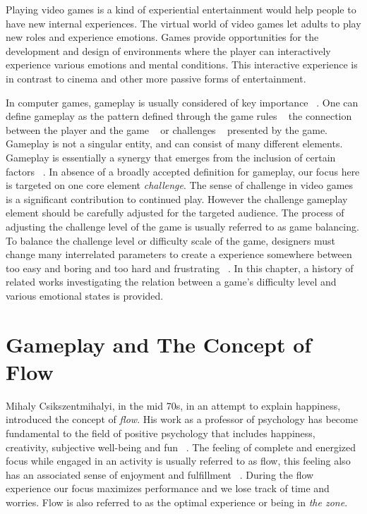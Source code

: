 
Playing video games is a kind of experiential entertainment would help people to have new internal experiences. The virtual world of video games let adults to play new roles and experience emotions. Games provide opportunities for the development and design of environments where the player can interactively experience various emotions and mental conditions. This interactive experience is in contrast to cinema and other more passive forms of entertainment.

In computer games, gameplay is usually considered of key importance ~\cite{rollings2006fundamentals, malone1982makes}. One can define gameplay as the pattern defined through the game rules ~\cite{salen2004rules, pajares2008understanding} the connection between the player and the game ~\cite{laramee2002game} or challenges ~\cite{rollings2003andrew} presented by the game. Gameplay is not a singular entity, and can consist of many different elements. Gameplay is essentially a synergy that emerges from the inclusion of certain factors ~\cite{rollings2003andrew}. In absence of a broadly accepted definition for gameplay, our focus here is targeted on one core element \textit{challenge}. The sense of challenge in video games is a significant contribution to continued play. However the challenge gameplay element should be carefully adjusted for the targeted audience. The process of adjusting the challenge level of the game is usually referred to as game balancing. To balance the challenge level or difficulty scale of the game, designers must change many interrelated parameters to create a experience somewhere between too easy and boring and too hard and frustrating ~\cite{koster2013theory}. In this chapter, a history of related works investigating the relation between a game's difficulty level and various emotional states is provided.

\section{Gameplay and The Concept of Flow}
Mihaly Csikszentmihalyi, in the mid 70s, in an attempt to explain happiness, introduced the concept of \textit{flow}. His work as a professor of psychology has become fundamental to the field of positive psychology that includes happiness, creativity, subjective well-being and fun ~\cite{csikszentmihalyi1990flow}. The feeling of complete and energized focus while engaged in an activity is usually referred to as flow, this feeling also has an associated sense of enjoyment and fulfillment ~\cite{csikszentmihalyi1990flow}. During the flow experience our focus maximizes performance and we lose track of time and worries. Flow is also referred to as the optimal experience or being in \textit{the zone}.

